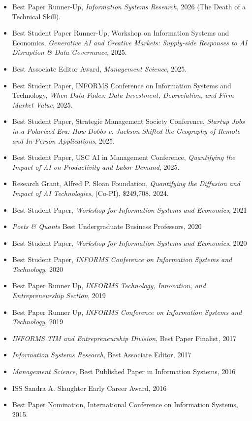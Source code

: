\documentclass[10pt,letterpaper]{article}
\begin{document}
\begin{itemize}
\item Best Paper Runner-Up, \textit{Information Systems Research}, 2026 (The Death of a Technical Skill).
\item Best Student Paper Runner-Up, Workshop on Information Systems and Economics, \textit{Generative AI and Creative Markets: Supply-side Responses to AI Disruption \& Data Governance}, 2025.
\item Best Associate Editor Award, \textit{Management Science}, 2025.
\item Best Student Paper, INFORMS Conference on Information Systems and Technology, \textit{When Data Fades: Data Investment, Depreciation, and Firm Market Value}, 2025.
\item Best Student Paper, Strategic Management Society Conference, \textit{Startup Jobs in a Polarized Era: How Dobbs v. Jackson Shifted the Geography of Remote and In-Person Applications}, 2025.
\item Best Student Paper, USC AI in Management Conference, \textit{Quantifying the Impact of AI on Productivity and Labor Demand}, 2025.
\item Research Grant, Alfred P. Sloan Foundation, \textit{Quantifying the Diffusion and Impact of AI Technologies}, (Co-PI), \$249,708, 2024.
\item Best Student Paper, \textit{Workshop for Information Systems and Economics}, 2021
\item \emph{Poets \& Quants} Best Undergraduate Business Professors, 2020
\item Best Student Paper, \textit{Workshop for Information Systems and Economics}, 2020
\item Best Student Paper, \textit{INFORMS Conference on Information Systems and Technology}, 2020
\item Best Paper Runner Up, \textit{INFORMS Technology, Innovation, and Entrepreneurship Section}, 2019
\item Best Paper Runner Up, \textit{INFORMS Conference on Information Systems and Technology}, 2019
\item \textit{INFORMS TIM and Entrepreneurship Division}, Best Paper Finalist, 2017
\item \textit{Information Systems Research}, Best Associate Editor, 2017
\item \textit{Management Science}, Best Published Paper in Information Systems, 2016
\item ISS Sandra A. Slaughter Early Career Award, 2016
\item Best Paper Nomination, International Conference on Information Systems, 2015.

\end{itemize}
\end{document}
